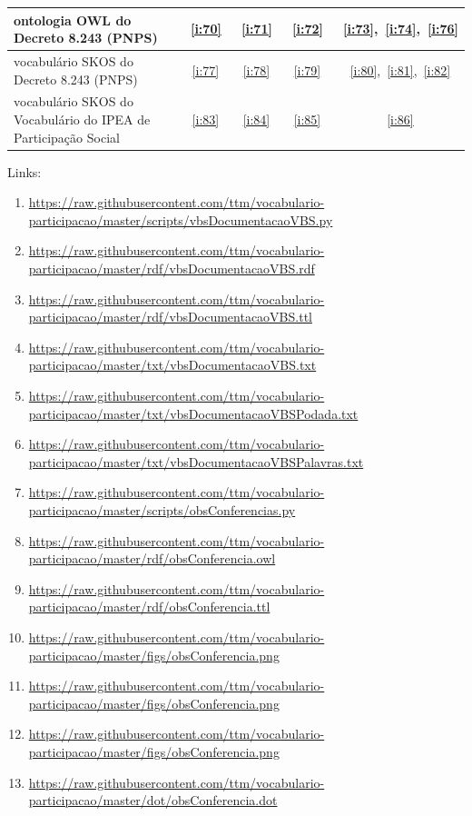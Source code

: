 \documentclass[12pt]{article}
\begin{document}
\begin{table}[htpq!]
\begin{tabular}{| p{6cm} | c | c | c | c | }
ontologia   OWL  do Decreto 8.243 (PNPS) &~\ref{i:70}&~\ref{i:71}&~\ref{i:72}&~\ref{i:73},~\ref{i:74},~\ref{i:76} \\\hline
vocabulário SKOS do Decreto 8.243 (PNPS) &~\ref{i:77}&~\ref{i:78}&~\ref{i:79}&~\ref{i:80},~\ref{i:81},~\ref{i:82} \\\hline\hline

vocabulário SKOS do Vocabulário do IPEA de Participação Social &~\ref{i:83}&~\ref{i:84}&~\ref{i:85}&~\ref{i:86} \\\hline\hline


\end{tabular}\label{eq:intervalos}
\end{table}

Links:
{\scriptsize
\begin{enumerate}
    \item \url{https://raw.githubusercontent.com/ttm/vocabulario-participacao/master/scripts/vbsDocumentacaoVBS.py}\label{i:1}
    \item \url{https://raw.githubusercontent.com/ttm/vocabulario-participacao/master/rdf/vbsDocumentacaoVBS.rdf}\label{i:2}
    \item \url{https://raw.githubusercontent.com/ttm/vocabulario-participacao/master/rdf/vbsDocumentacaoVBS.ttl}\label{i:3}
    \item \url{https://raw.githubusercontent.com/ttm/vocabulario-participacao/master/txt/vbsDocumentacaoVBS.txt} \label{i:4}
    \item \url{https://raw.githubusercontent.com/ttm/vocabulario-participacao/master/txt/vbsDocumentacaoVBSPodada.txt}\label{i:4_1}
    \item \url{https://raw.githubusercontent.com/ttm/vocabulario-participacao/master/txt/vbsDocumentacaoVBSPalavras.txt}\label{i:5}

    \item \url{https://raw.githubusercontent.com/ttm/vocabulario-participacao/master/scripts/obsConferencias.py}\label{i:6}
    \item \url{https://raw.githubusercontent.com/ttm/vocabulario-participacao/master/rdf/obsConferencia.owl}\label{i:7}
    \item \url{https://raw.githubusercontent.com/ttm/vocabulario-participacao/master/rdf/obsConferencia.ttl}\label{i:8}
    \item \url{https://raw.githubusercontent.com/ttm/vocabulario-participacao/master/figs/obsConferencia.png}\label{i:9}
    \item \url{https://raw.githubusercontent.com/ttm/vocabulario-participacao/master/figs/obsConferencia.png}\label{i:10}
    \item \url{https://raw.githubusercontent.com/ttm/vocabulario-participacao/master/figs/obsConferencia.png}\label{i:11}
    \item \url{https://raw.githubusercontent.com/ttm/vocabulario-participacao/master/dot/obsConferencia.dot}\label{i:11_1}


\end{enumerate}}
\end{document}
